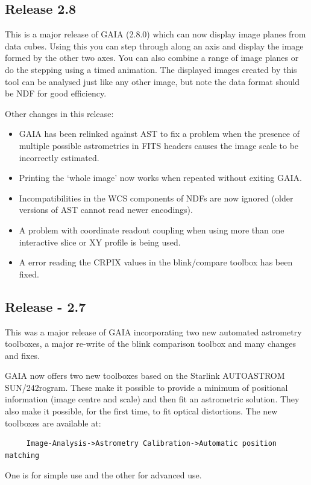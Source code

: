 \documentclass[twoside,11pt]{article}
\newcommand{\xref}[3]{#1}
\renewcommand{\_}{\texttt{\symbol{95}}}
\begin{document}
\subsection{Release 2.8}

This is a major release of GAIA (2.8.0) which can now display image planes
from data cubes. Using this you can step through along an axis and display the
image formed by the other two axes.  You can also combine a range of image
planes or do the stepping using a timed animation. The displayed images
created by this tool can be analysed just like any other image, but note the
data format should be NDF for good efficiency.

Other changes in this release:
\begin{itemize}
 \item GAIA has been relinked against AST to fix a problem when the
       presence of multiple possible astrometries in FITS headers
       causes the image scale to be incorrectly estimated.

 \item Printing the `whole image' now works when repeated without exiting
       GAIA.

 \item Incompatibilities in the WCS components of NDFs are now ignored (older
       versions of AST cannot read newer encodings).

 \item A problem with coordinate readout coupling when using more than one
       interactive slice or XY profile is being used.

 \item A error reading the CRPIX values in the blink/compare toolbox has been
       fixed.
\end{itemize}

\subsection{Release - 2.7}
This was a major release of GAIA incorporating two new automated astrometry
toolboxes, a major re-write of the blink comparison toolbox and many
changes and fixes.

GAIA now offers two new toolboxes based on the Starlink
AUTOASTROM \xref{SUN/242}{sun242} program. These make it possible to provide a
minimum of positional information (image centre and scale) and then fit an
astrometric solution. They also make it possible, for the first time, to fit
optical distortions. The new toolboxes are available at:
\begin{verbatim}
     Image-Analysis->Astrometry Calibration->Automatic position matching
\end{verbatim}
One is for simple use and the other for advanced use.
\end{document}

